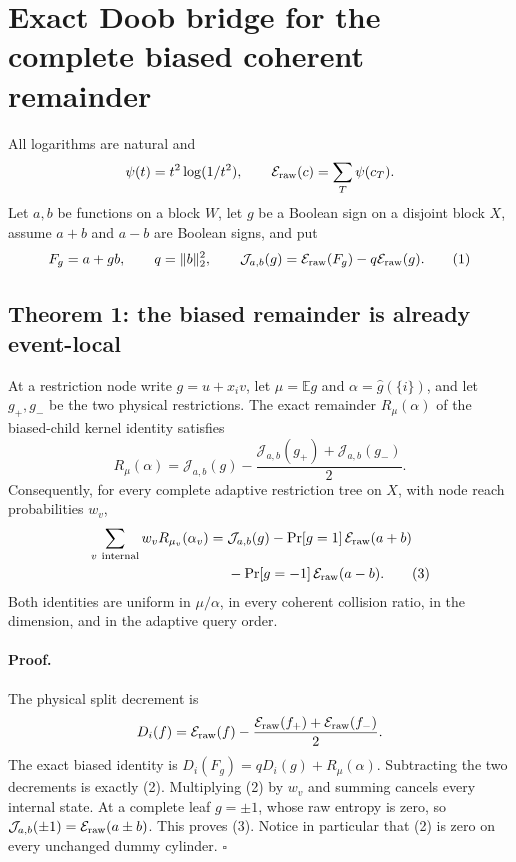 \section*{Exact Doob bridge for the complete biased coherent remainder}

All logarithms are natural and
\[
 \psi(t)=t^2\log(1/t^2),\qquad
 \mathcal E_{\rm raw}(c)=\sum_T\psi(c_T).
\]
Let $a,b$ be functions on a block $W$, let $g$ be a Boolean sign on a
disjoint block $X$, assume $a+b$ and $a-b$ are Boolean signs, and put
\[
 F_g=a+gb,\qquad q=\|b\|_2^2,
 \qquad \mathcal J_{a,b}(g)=\mathcal E_{\rm raw}(F_g)
                         -q\mathcal E_{\rm raw}(g).                 \tag{1}
\]

\subsection*{Theorem 1: the biased remainder is already event-local}

At a restriction node write $g=u+x_i v$, let
$\mu=\mathbb Eg$ and $\alpha=\widehat g(\{i\})$, and let $g_+,g_-$ be
the two physical restrictions.  The exact remainder $R_\mu(\alpha)$ of
the biased-child kernel identity satisfies
\[
 \boxed{R_\mu(\alpha)=\mathcal J_{a,b}(g)
 -\frac{\mathcal J_{a,b}(g_+)+\mathcal J_{a,b}(g_-)}2.}             \tag{2}
\]
Consequently, for every complete adaptive restriction tree on $X$, with
node reach probabilities $w_v$,
\begin{align*}
 \sum_{v\ {\rm internal}}w_vR_{\mu_v}(\alpha_v)
  ={}&\mathcal J_{a,b}(g)
    -\Pr[g=1]\,\mathcal E_{\rm raw}(a+b)\\
   &-\Pr[g=-1]\,\mathcal E_{\rm raw}(a-b).                         \tag{3}
\end{align*}
Both identities are uniform in $\mu/\alpha$, in every coherent collision
ratio, in the dimension, and in the adaptive query order.

\paragraph{Proof.}
The physical split decrement is
\[
 D_i(f)=\mathcal E_{\rm raw}(f)
       -\frac{\mathcal E_{\rm raw}(f_+)+
              \mathcal E_{\rm raw}(f_-)}2.
\]
The exact biased identity is
$D_i(F_g)=qD_i(g)+R_\mu(\alpha)$.  Subtracting the two decrements is
exactly (2).  Multiplying (2) by $w_v$ and summing cancels every internal
state.  At a complete leaf $g=\pm1$, whose raw entropy is zero, so
$\mathcal J_{a,b}(\pm1)=\mathcal E_{\rm raw}(a\pm b)$.  This proves
(3).  Notice in particular that (2) is zero on every unchanged dummy
cylinder. \(\square\)

